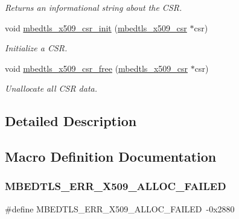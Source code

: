 \begin{DoxyCompactItemize}
\begin{DoxyCompactList}\small\item\em Returns an informational string about the C\+SR. \end{DoxyCompactList}\item 
void \mbox{\hyperlink{group__x509__module_ga984db025f6953ea61be7dfca2d928f37}{mbedtls\+\_\+x509\+\_\+csr\+\_\+init}} (\mbox{\hyperlink{structmbedtls__x509__csr}{mbedtls\+\_\+x509\+\_\+csr}} $\ast$csr)
\begin{DoxyCompactList}\small\item\em Initialize a C\+SR. \end{DoxyCompactList}\item 
void \mbox{\hyperlink{group__x509__module_gac2139becff64aa7294ecad4f40767a84}{mbedtls\+\_\+x509\+\_\+csr\+\_\+free}} (\mbox{\hyperlink{structmbedtls__x509__csr}{mbedtls\+\_\+x509\+\_\+csr}} $\ast$csr)
\begin{DoxyCompactList}\small\item\em Unallocate all C\+SR data. \end{DoxyCompactList}\end{DoxyCompactItemize}


\subsection{Detailed Description}


\subsection{Macro Definition Documentation}
\mbox{\label{group__x509__module_gacf6d98c6cbb76728260d1dcb1fe3bc7d}} 
\subsubsection{\texorpdfstring{M\+B\+E\+D\+T\+L\+S\+\_\+\+E\+R\+R\+\_\+\+X509\+\_\+\+A\+L\+L\+O\+C\+\_\+\+F\+A\+I\+L\+ED}{MBEDTLS\_ERR\_X509\_ALLOC\_FAILED}}
{\footnotesize\ttfamily \#define M\+B\+E\+D\+T\+L\+S\+\_\+\+E\+R\+R\+\_\+\+X509\+\_\+\+A\+L\+L\+O\+C\+\_\+\+F\+A\+I\+L\+ED~-\/0x2880}

